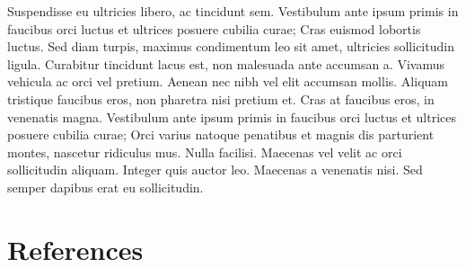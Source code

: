 \begin{refsection}
Suspendisse eu ultricies libero, ac tincidunt sem. Vestibulum ante ipsum primis in faucibus orci luctus et ultrices posuere cubilia curae; Cras euismod lobortis luctus. Sed diam turpis, maximus condimentum leo sit amet, ultricies sollicitudin ligula. Curabitur tincidunt lacus est, non malesuada ante accumsan a. Vivamus vehicula ac orci vel pretium. Aenean nec nibh vel elit accumsan mollis. Aliquam tristique faucibus eros, non pharetra nisi pretium et. Cras at faucibus eros, in venenatis magna. Vestibulum ante ipsum primis in faucibus orci luctus et ultrices posuere cubilia curae; Orci varius natoque penatibus et magnis dis parturient montes, nascetur ridiculus mus. Nulla facilisi. Maecenas vel velit ac orci sollicitudin aliquam. Integer quis auctor leo. Maecenas a venenatis nisi. Sed semper dapibus erat eu sollicitudin.

\newpage
\section*{References}

\printbibliography[heading=none]

\end{refsection}
\RemoveLabels